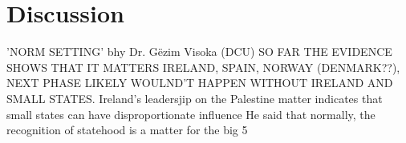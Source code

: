 \chapter{Discussion}


'NORM SETTING' bhy Dr. Gëzim Visoka (DCU)
SO FAR THE EVIDENCE SHOWS THAT IT MATTERS
IRELAND, SPAIN, NORWAY (DENMARK??), NEXT PHASE LIKELY WOULND’T HAPPEN WITHOUT IRELAND AND SMALL STATES. Ireland’s leadersjip on the Palestine matter indicates that small states can have disproportionate influence
He said that normally, the recognition of statehood is a matter for the big 5
